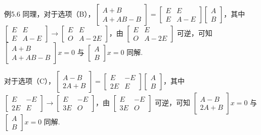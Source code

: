 \begin{fcard}{例5.6}
同理，对于选项（B），$\begin{bmatrix}A+B\\A+AB-B\end{bmatrix}=\begin{bmatrix}E&E\\E&A-E\end{bmatrix}\begin{bmatrix}A\\B\end{bmatrix}$，其中 $\begin{bmatrix}E&E\\E&A-E\end{bmatrix}\to\begin{bmatrix}E&E\\O&A-2E\end{bmatrix}$，由 $\begin{bmatrix}E&E\\O&A-2E\end{bmatrix}$ 可逆，可知 $\begin{bmatrix}A+B\\A+AB-B\end{bmatrix}x=0$ 与 $\begin{bmatrix}A\\B\end{bmatrix}x=0$ 同解.

对于选项（C），$\begin{bmatrix}A-B\\2A+B\end{bmatrix}=\begin{bmatrix}E&-E\\2E&E\end{bmatrix}\begin{bmatrix}A\\B\end{bmatrix}$，其中 $\begin{bmatrix}E&-E\\2E&E\end{bmatrix}\to\begin{bmatrix}E&-E\\3E&O\end{bmatrix}$，由 $\begin{bmatrix}E&-E\\3E&O\end{bmatrix}$ 可逆，可知 $\begin{bmatrix}A-B\\2A+B\end{bmatrix}x=0$ 与 $\begin{bmatrix}A\\B\end{bmatrix}x=0$ 同解.


\end{fcard}
